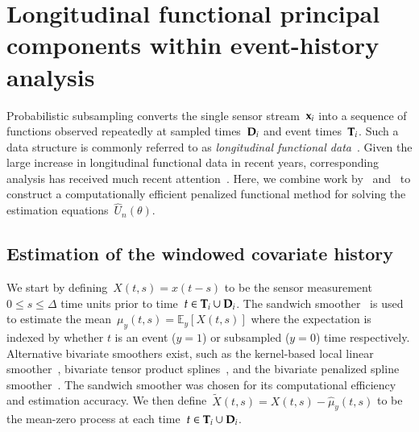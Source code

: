 \documentclass[12pt]{amsart}
\def\E{\mathcal{E}}
\def\E{\mathbb{E}}
\def\bfx{{\bf x}}
\def\bfT{{\bf T}}
\def\bfD{{\bf D}}
\begin{document}
\section{Longitudinal functional principal components within
  event-history analysis}

Probabilistic subsampling converts the single sensor stream~$\bfx_i$ into a sequence of functions observed repeatedly at sampled times~$\bfD_i$ and event times~$\bfT_i$. Such a data structure is commonly referred to as \emph{longitudinal functional data}~\citep{Xiao2013, GoldSmith2015}. Given the large increase in longitudinal functional data in recent years, corresponding analysis has received much recent attention~\citep{Morris2003, MorrisCarroll2006, Baladandayuthapani2008, Di2009, Greven2010, Staicu2010, ChenMuller2012, LiGuan2014}. Here, we combine work by~\cite{Park2018} and~\cite{Goldsmith2011} to construct a computationally efficient penalized functional method for solving the estimation equations~$\hat U_n (\theta)$.

\subsection{Estimation of the windowed covariate history}
\label{sec:margcov}
We start by defining~$X(t,s) = x(t-s)$ to be the sensor measurement~$0 \leq s \leq \Delta$ time units prior to time~$t \in \bfT_i \cup \bfD_i$. The sandwich smoother~\citep{Xiao2013} is used to estimate the mean~$\mu_y(t,s) = \E_y [ X(t,s)]$ where the expectation is indexed by whether $t$ is an event ($y=1$) or subsampled ($y=0$) time respectively. Alternative bivariate smoothers exist, such as the kernel-based local linear smoother~\citep{Hastie2009}, bivariate tensor product splines~\citep{Wood2006}, and the bivariate penalized spline smoother~\citep{MarxEilers2005}. The sandwich smoother was chosen for its computational efficiency and estimation accuracy. We then define~$\tilde X(t,s) = X(t,s) - \hat \mu_y(t,s)$ to be the mean-zero process at each time~$t \in \bfT_i \cup \bfD_i$.
\end{document}
